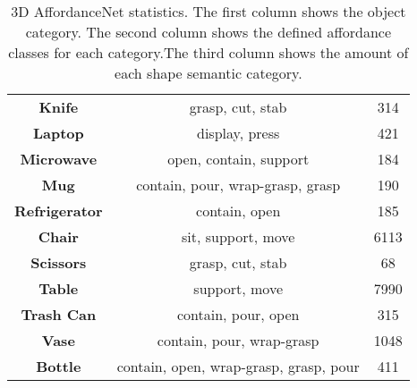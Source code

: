\documentclass[final]{cvpr}
\begin{document}
\begin{table}[t]
\begin{center}
{\begin{tabular}{c|c|c}
            \textbf{Knife}             & grasp, cut, stab                                           & 314                             \\
            \textbf{Laptop}            & display, press                                             & 421                            \\
            \textbf{Microwave}         & open, contain, support                                     & 184                             \\
            \textbf{Mug}               & contain, pour, wrap-grasp, grasp                           & 190                            \\
            \textbf{Refrigerator}      & contain, open                                              & 185                             \\
            \textbf{Chair}             & sit, support, move                                         & 6113                          \\
            \textbf{Scissors}          & grasp, cut, stab                                           & 68                              \\
            \textbf{Table}             & support, move                                              & 7990                            \\
            \textbf{Trash Can}         & contain, pour, open                                        & 315                            \\
            \textbf{Vase}              & contain, pour, wrap-grasp                                  & 1048                           \\
            \textbf{Bottle}            & contain, open, wrap-grasp, grasp, pour                     & 411                \\ \hline
         \end{tabular}}
   \end{center}
   \vspace{-0.2cm}
   \caption{3D AffordanceNet statistics. The first column shows the object category. The second column shows the defined affordance classes for each category.The third column shows the amount of each shape semantic category. }
   \label{dataset_stats}
   \vspace{-0.2cm}
\end{table}
\end{document}
